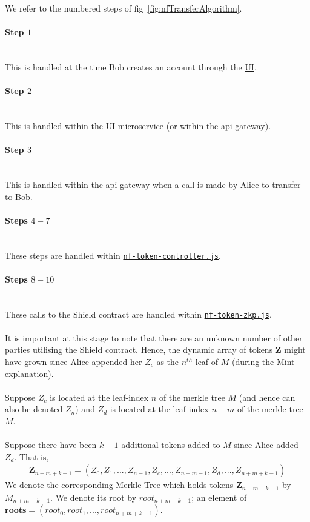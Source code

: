 \documentclass{article}
\begin{document}
We refer to the numbered steps of fig~\ref{fig:nfTransferAlgorithm}.

\paragraph{Step $1$}
\ \\
This is handled at the time Bob creates an account through the \hyperref[sec:ui]{UI}.

\paragraph{Step $2$}
\ \\
This is handled within the \hyperref[sec:ui]{UI} microservice (or within the api-gateway).

\paragraph{Step $3$}
\ \\
This is handled within the api-gateway when a call is made by Alice to transfer to Bob.

\paragraph{Steps $4 - 7$}
\ \\
These steps are handled within \hyperref[sec:nf-token-controller]{\texttt{nf-token-controller.js}}.

\paragraph{Steps $8 - 10$}
\ \\
These calls to the Shield contract are handled within \hyperref[sec:nf-token-zkp]{\texttt{nf-token-zkp.js}}.\\
\\
It is important at this stage to note that there are an unknown number of other parties utilising the Shield contract.
Hence, the dynamic array of tokens $\bm{Z}$ might have grown since Alice appended her $Z_c$ as the $n^{th}$ leaf of $M$ (during the \hyperref[sec:20Mint]{Mint} explanation).\\
\\
Suppose $Z_c$ is located at the leaf-index $n$ of the merkle tree $M$ (and hence can also be denoted $Z_n$) and $Z_d$ is located at the leaf-index $n+m$ of the merkle tree $M$.\\
\\
Suppose there have been $k-1$ additional tokens added to $M$ since Alice added $Z_d$.
That is,\\
\begin{align*}
  \bm{Z}_{n+m+k-1} = (Z_0, Z_1,...,Z_{n-1}, Z_c, ..., Z_{n+m-1}, Z_d,..., Z_{n+m+k-1})
\end{align*}
We denote the corresponding Merkle Tree which holds tokens $\bm{Z}_{n+m+k-1}$ by $M_{n+m+k-1}$.
We denote its root by $root_{n+m+k-1}$; an element of $\bm{roots} = (root_0, root_1,...,root_{n+m+k-1})$.\\
\\
\end{document}
